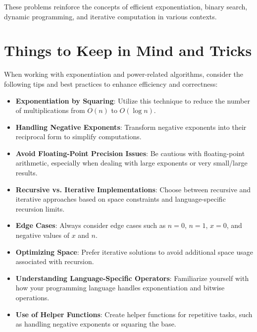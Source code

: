 These problems reinforce the concepts of efficient exponentiation, binary search, dynamic programming, and iterative computation in various contexts.

\section*{Things to Keep in Mind and Tricks}

When working with exponentiation and power-related algorithms, consider the following tips and best practices to enhance efficiency and correctness:

\begin{itemize}
    \item \textbf{Exponentiation by Squaring}: Utilize this technique to reduce the number of multiplications from \(O(n)\) to \(O(\log n)\).
    
    \item \textbf{Handling Negative Exponents}: Transform negative exponents into their reciprocal form to simplify computations.
    
    \item \textbf{Avoid Floating-Point Precision Issues}: Be cautious with floating-point arithmetic, especially when dealing with large exponents or very small/large results.
    
    \item \textbf{Recursive vs. Iterative Implementations}: Choose between recursive and iterative approaches based on space constraints and language-specific recursion limits.
    
    \item \textbf{Edge Cases}: Always consider edge cases such as \(n = 0\), \(n = 1\), \(x = 0\), and negative values of \(x\) and \(n\).
    
    \item \textbf{Optimizing Space}: Prefer iterative solutions to avoid additional space usage associated with recursion.
    
    \item \textbf{Understanding Language-Specific Operators}: Familiarize yourself with how your programming language handles exponentiation and bitwise operations.
    
    \item \textbf{Use of Helper Functions}: Create helper functions for repetitive tasks, such as handling negative exponents or squaring the base.
    

\end{itemize}
